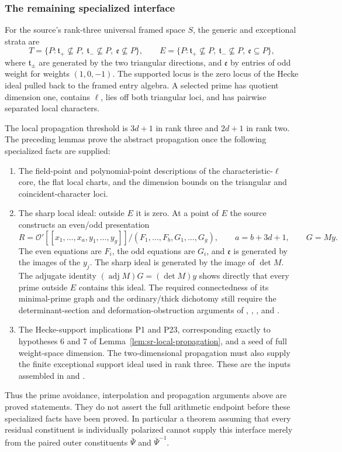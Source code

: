 \subsubsection{The remaining specialized interface}
For the source's rank-three universal framed space $S$, the generic
and exceptional strata are
\[
 T=\{P:\mathfrak t_+\not\subseteq P,\
          \mathfrak t_-\not\subseteq P,\
          \mathfrak e\not\subseteq P\},\qquad
 E=\{P:\mathfrak t_+\not\subseteq P,\
          \mathfrak t_-\not\subseteq P,\
          \mathfrak e\subseteq P\},
\]
where $\mathfrak t_\pm$ are generated by the two triangular directions,
and $\mathfrak e$ by entries of odd weight for weights $(1,0,-1)$.
The supported locus is the zero locus of the Hecke ideal pulled back
to the framed entry algebra.
A selected prime has quotient dimension one, contains $\ell$, lies
off both triangular loci, and has pairwise separated local characters.

The local propagation threshold is $3d+1$ in rank three and $2d+1$
in rank two. The preceding lemmas prove the abstract propagation
once the following specialized facts are supplied:
\begin{enumerate}
\item The field-point and polynomial-point descriptions of the
characteristic-$\ell$ core, the flat local charts, and the dimension
bounds on the triangular and coincident-character loci.
\item The sharp local ideal: outside $E$ it is zero. At a point of $E$
the source constructs an even/odd presentation
\[
 R=\mathcal O'[[x_1,\ldots,x_a,y_1,\ldots,y_g]]
                         /(F_1,\ldots,F_b,G_1,\ldots,G_g),
 \qquad a=b+3d+1,\qquad G=M y .
\]
The even equations are $F_i$, the odd equations are $G_i$, and
$\mathfrak e$ is generated by the images of the $y_j$.
The sharp ideal is generated by the image of $\det M$.
The adjugate identity $(\operatorname{adj}M)G=(\det M)y$ shows directly
that every prime outside $E$ contains this ideal.
The required connectedness of its minimal-prime graph and the
ordinary/thick dichotomy still require the determinant-section and
deformation-obstruction arguments of
\srcid{Detsec}, \srcid{SumLe}, , and
\srcid{ThickOfDer}.
\item The Hecke-support implications P1 and P23, corresponding exactly
to hypotheses 6 and 7 of Lemma~\ref{lem:sr-local-propagation}, and a
seed of full weight-space dimension. The two-dimensional propagation
must also supply the finite exceptional support ideal used in rank
three. These are the inputs assembled in \srcid{PrLinkedEnd} and
\srcid{AbsMain}.
\end{enumerate}
Thus the prime avoidance, interpolation and propagation arguments
above are proved statements. They do not assert the full arithmetic
endpoint before these specialized facts have been proved.
In particular a theorem assuming that every residual constituent
is individually polarized cannot supply this interface merely from
the paired outer constituents $\bar\Psi$ and $\bar\Psi^{-1}$.

